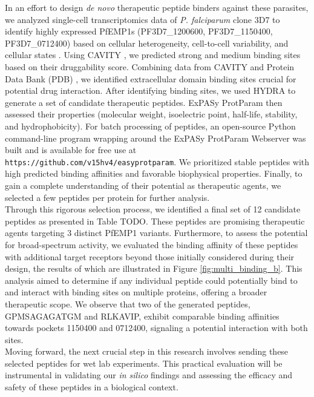In an effort to design \textit{de novo} therapeutic peptide binders against these parasites, we analyzed single-cell transcriptomics data of \textit{P. falciparum} clone 3D7 to identify highly expressed PfEMP1s (PF3D7\_1200600, PF3D7\_1150400, PF3D7\_0712400) based on cellular heterogeneity, cell-to-cell variability, and cellular states \cite{choudhuri2024computational}. Using CAVITY \cite{Yuan2013}, we predicted strong and medium binding sites based on their druggability score. Combining data from CAVITY and Protein Data Bank (PDB) \cite{Berman2000}, we identified extracellular domain binding sites crucial for potential drug interaction. After identifying binding sites, we used HYDRA to generate a set of candidate therapeutic peptides. ExPASy ProtParam \cite{gasteiger2003expasy} then assessed their properties (molecular weight, isoelectric point, half-life, stability, and hydrophobicity). For batch processing of peptides, an open-source Python command-line program wrapping around the ExPASy ProtParam Webserver was built and is available for free use at \texttt{https://github.com/v15hv4/easyprotparam}. We prioritized stable peptides with high predicted binding affinities and favorable biophysical properties. Finally, to gain a complete understanding of their potential as therapeutic agents, we selected a few peptides per protein for further analysis. \\

Through this rigorous selection process, we identified a final set of 12 candidate peptides as presented in Table TODO. These peptides are promising therapeutic agents targeting 3 distinct PfEMP1 variants. Furthermore, to assess the potential for broad-spectrum activity, we evaluated the binding affinity of these peptides with additional target receptors beyond those initially considered during their design, the results of which are illustrated in Figure \ref{fig:multi_binding_b}. This analysis aimed to determine if any individual peptide could potentially bind to and interact with binding sites on multiple proteins, offering a broader therapeutic scope. We observe that two of the generated peptides, GPMSAGAGATGM and RLKAVIP, exhibit comparable binding affinities towards pockets 1150400 and 0712400, signaling a potential interaction with both sites. \\

Moving forward, the next crucial step in this research involves sending these selected peptides for wet lab experiments. This practical evaluation will be instrumental in validating our \textit{in silico} findings and assessing the efficacy and safety of these peptides in a biological context. \\
